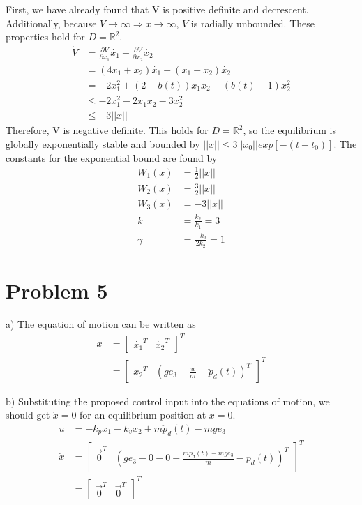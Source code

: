 \documentclass[paper=a4, fontsize=11pt]{scrartcl} %
\numberwithin{equation}{section} %
\numberwithin{figure}{section} %
\numberwithin{table}{section} %
\begin{document}
First, we have already found that V is positive definite and decrescent. Additionally, because $V\rightarrow \infty \Rightarrow x \rightarrow \infty$, $V$ is radially unbounded. These properties hold for $D = \mathbb{R}^2$.
\begin{align}
\dot{V} &= \frac{\partial V}{\partial x_1}\dot{x_1} + \frac{\partial V}{\partial x_2}\dot{x_2} \\
&= (4x_1 + x_2)\dot{x_1} + (x_1+x_2)\dot{x_2} \\
&= -2x_1^2 + (2-b(t))x_1x_2 - (b(t)-1)x_2^2 \\
&\leq -2x_1^2 -2x_1x_2 - 3x_2^2 \\
&\leq -3 \lvert\lvert x \rvert\rvert
\end{align}
Therefore, V is negative definite. This holds for $D = \mathbb{R}^2$, so the equilibrium is globally exponentially stable and bounded by $\lvert\lvert x \rvert\rvert \leq 3\lvert\lvert x_0\rvert\rvert exp[-(t-t_0)]$. The constants for the exponential bound are found by
\begin{align}
W_1(x) &=\frac{1}{2}\lvert\lvert x \rvert\rvert \\
W_2(x) &=\frac{3}{2}\lvert\lvert x \rvert\rvert \\
W_3(x) &=-3\lvert\lvert x \rvert\rvert \\
k &= \frac{k_2}{k_1} = 3 \\
\gamma &= \frac{-k_3}{2k_2} = 1
\end{align}

\newpage

\section{Problem 5}
a) The equation of motion can be written as 
\begin{align}
\dot{x} &= \begin{bmatrix}\dot{x_1}^T & \dot{x_2}^T\end{bmatrix}^T \\
&= \begin{bmatrix}{x_2}^T & {(ge_3+\frac{u}{m}-\ddot{p}_d(t))}^T\end{bmatrix}^T
\end{align}

b) Substituting the proposed control input into the equations of motion, we should get $\dot{x}=0$ for an equilibrium position at $x=0$.
\begin{align}
u &= -k_px_1 - k_vx_2 + m\ddot{p}_d(t)-mge_3 \\
\dot{x} &= \begin{bmatrix}\vec{0}^T & (ge_3-0-0+\frac{m\ddot{p}_d(t) - mge_3}{m} - \ddot{p}_d(t))^T\end{bmatrix}^T \\
&= \begin{bmatrix}\vec{0}^T & \vec{0}^T \end{bmatrix}^T
\end{align}
\end{document}

